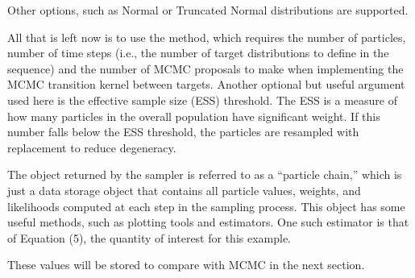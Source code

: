 \documentclass[letterpaper,10pt,english]{sphinxmanual}
\begin{document}
Other options, such as Normal or Truncated Normal distributions are supported.

All that is left now is to use the  method, which requires the number of particles, number of time steps (i.e., the number of target distributions to define in the sequence) and the number of MCMC proposals to make when implementing the MCMC transition kernel between targets. Another optional but useful argument used here is the effective sample size (ESS) threshold. The ESS is a measure of how many particles in the overall population have significant weight. If this number falls below the ESS threshold, the particles are resampled with replacement to reduce degeneracy.

\begin{sphinxVerbatim}[commandchars=\\\{\}]
  
  
  
    
     
\end{sphinxVerbatim}

The object returned by the sampler is referred to as a “particle chain,” which
is just a data storage object that contains all particle values, weights, and
likelihoods computed at each step in the sampling process. This object has some useful methods, such as plotting tools and estimators. One such estimator is that of Equation (5), the quantity of interest for this example.

\begin{sphinxVerbatim}[commandchars=\\\{\}]
  
\end{sphinxVerbatim}

These values will be stored to compare with MCMC in the next section.
\end{document}
